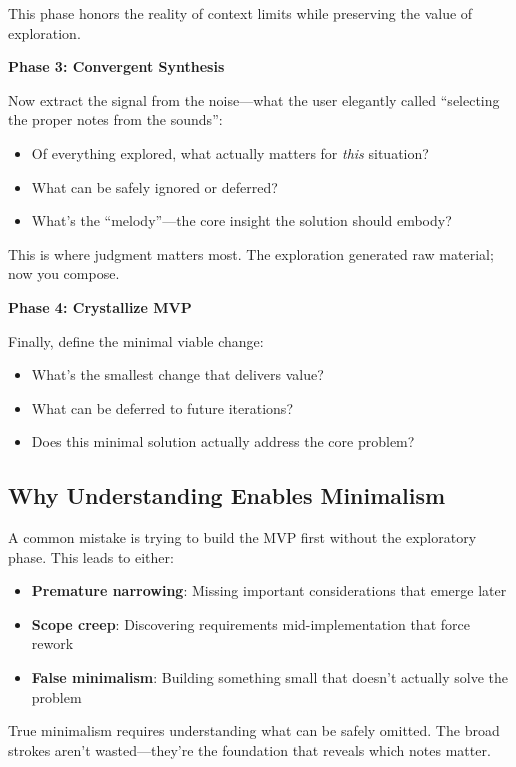 This phase honors the reality of context limits while preserving the value of exploration.

\textbf{Phase 3: Convergent Synthesis}

Now extract the signal from the noise---what the user elegantly called ``selecting the proper notes from the sounds'':
\begin{itemize}
    \item Of everything explored, what actually matters for \emph{this} situation?
    \item What can be safely ignored or deferred?
    \item What's the ``melody''---the core insight the solution should embody?
\end{itemize}

This is where judgment matters most. The exploration generated raw material; now you compose.

\textbf{Phase 4: Crystallize MVP}

Finally, define the minimal viable change:
\begin{itemize}
    \item What's the smallest change that delivers value?
    \item What can be deferred to future iterations?
    \item Does this minimal solution actually address the core problem?
\end{itemize}

\subsection{Why Understanding Enables Minimalism}

A common mistake is trying to build the MVP first without the exploratory phase. This leads to either:
\begin{itemize}
    \item \textbf{Premature narrowing}: Missing important considerations that emerge later
    \item \textbf{Scope creep}: Discovering requirements mid-implementation that force rework
    \item \textbf{False minimalism}: Building something small that doesn't actually solve the problem
\end{itemize}

True minimalism requires understanding what can be safely omitted. The broad strokes aren't wasted---they're the foundation that reveals which notes matter.

